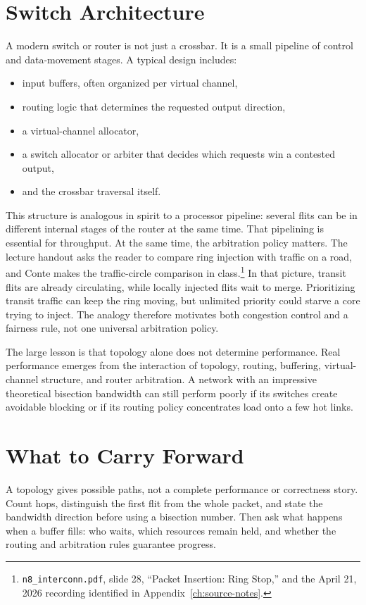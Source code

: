 \section{Switch Architecture}\label{sec:pin-switch-architecture}
A modern switch or router is not just a crossbar.
It is a small pipeline of control and data-movement stages.
A typical design includes:
\begin{itemize}
    \item input buffers, often organized per virtual channel,
    \item routing logic that determines the requested output direction,
    \item a virtual-channel allocator,
    \item a switch allocator or arbiter that decides which requests win a contested output,
    \item and the crossbar traversal itself.
\end{itemize}

This structure is analogous in spirit to a processor pipeline: several flits can be in different internal stages of the router at the same time.
That pipelining is essential for throughput.
At the same time, the arbitration policy matters.
The lecture handout asks the reader to compare ring injection with traffic on a road, and Conte makes the traffic-circle comparison in class.\footnote{\texttt{n8\_interconn.pdf}, slide 28, ``Packet Insertion: Ring Stop,'' and the April 21, 2026 recording identified in Appendix~\ref{ch:source-notes}.}
In that picture, transit flits are already circulating, while locally injected flits wait to merge.
Prioritizing transit traffic can keep the ring moving, but unlimited priority could starve a core trying to inject.
The analogy therefore motivates both congestion control and a fairness rule, not one universal arbitration policy.

The large lesson is that topology alone does not determine performance.
Real performance emerges from the interaction of topology, routing, buffering, virtual-channel structure, and router arbitration.
A network with an impressive theoretical bisection bandwidth can still perform poorly if its switches create avoidable blocking or if its routing policy concentrates load onto a few hot links.


\section{What to Carry Forward}\label{sec:chapter10-summary}
A topology gives possible paths, not a complete performance or correctness story.
Count hops, distinguish the first flit from the whole packet, and state the bandwidth direction before using a bisection number.
Then ask what happens when a buffer fills: who waits, which resources remain held, and whether the routing and arbitration rules guarantee progress.

